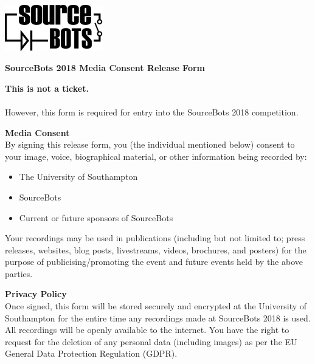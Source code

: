 \documentclass[a4paper]{article}
\begin{document}
\newcommand{\compyear}{2018\xspace}
\newcommand{\competition}{SourceBots \compyear}

\begin{minipage}[c]{0.30\textwidth}
\includegraphics[height=2cm]{fig-SourceBots}
\end{minipage}
\hspace{0.03\textwidth}
\begin{minipage}[c]{0.67\textwidth}
\begin{center}
{\large \textbf{\competition Media Consent Release Form} \par}
\end{center}
\end{minipage}
\vspace{1cm}

\textbf{This is not a ticket.}\\\\ However, this form is required for entry into the \competition competition.\\
\vspace{0.3cm}

\textbf{\large Media Consent}\\

By signing this release form, you (the individual mentioned below) consent to your image, voice, biographical material, or other information being recorded by:
\begin{itemize}
    \item The University of Southampton
    \item SourceBots
    \item Current or future sponsors of SourceBots
\end{itemize}
Your recordings may be used in publications (including but not limited to; press releases, websites, blog posts, livestreams, videos, brochures, and posters) for the purpose of publicising/promoting the event and future events held by the above parties.

\vspace{0.5cm}
\textbf{\large Privacy Policy}\\

Once signed, this form will be stored securely and encrypted at the University of Southampton for the entire time any recordings made at \competition is used. All recordings will be openly available to the internet. You have the right to request for the deletion of any personal data (including images) as per the EU General Data Protection Regulation (GDPR).
\end{document}
